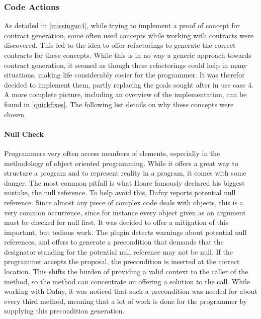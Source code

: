 \subsubsection{Code Actions}\label{addCodeActions}
As detailed in \ref{missinguc4}, while trying to implement a proof of concept for contract generation, some often used concepts while working with contracts were discovered. This led to the idea to offer refactorings to generate the correct contracts for these concepts. While this is in no way a generic approach towards contract generation, it seemed as though these refactorings could help in many situations, making life considerably easier for the programmer. It was therefor decided to implement them, partly replacing the goals sought after in use case 4. A more complete picture, including an overview of the implementation, can be found in \ref{quickfixes}. The following list details on why these concepts were chosen. \newline
 
\paragraph{Null Check}
Programmers very often access members of elements, especially in the methodology of object oriented programming. While it offers a great way to structure a program and to represent reality in a program, it comes with some danger. The most common pitfall is what Hoare famously declared his biggest mistake\cite{hoare}, the null reference. To help avoid this, Dafny reports potential null reference. Since almost any piece of complex code deals with objects, this is a very common occurrence, since for instance every object given as an argument must be checked for null first. \newline
It was decided to offer a mitigation of this important, but tedious work. The plugin detects warnings about potential null references, and offers to generate a precondition that demands that the designator standing for the potential null reference may not be null. If the programmer accepts the proposal, the precondition is inserted at the correct location. This shifts the burden of providing a valid context to the caller of the method, so the method can concentrate on offering a solution to the call. While working with Dafny, it was noticed that such a precondition was needed for about every third method, meaning that a lot of work is done for the programmer by supplying this precondition generation.
